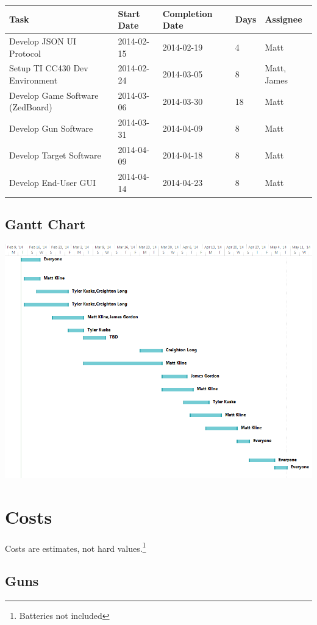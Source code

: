 \documentclass{article}
\begin{document}
\begin{tabular}{|l|l|l|l|l|}
\hline
\textbf{Task} & \textbf{Start Date} & \textbf{Completion Date} & \textbf{Days} & \textbf{Assignee} \\
\hline
Develop JSON UI Protocol & 2014-02-15 & 2014-02-19 & 4 & Matt \\
\hline
Setup TI CC430 Dev Environment & 2014-02-24 & 2014-03-05 & 8 & Matt, James \\
\hline
Develop Game Software (ZedBoard) & 2014-03-06 & 2014-03-30 & 18 & Matt \\
\hline
Develop Gun Software & 2014-03-31 & 2014-04-09 & 8 & Matt \\
\hline
Develop Target Software & 2014-04-09 & 2014-04-18 & 8 & Matt \\
\hline
Develop End-User GUI & 2014-04-14 & 2014-04-23 & 8 & Matt \\
\hline
\end{tabular}

\subsection{Gantt Chart}
\includegraphics[keepaspectratio, angle=90, width=6in]{schedule}

\section{Costs}

Costs are estimates, not hard values.\footnote{Batteries not included}

\subsection{Guns}
\end{document}

